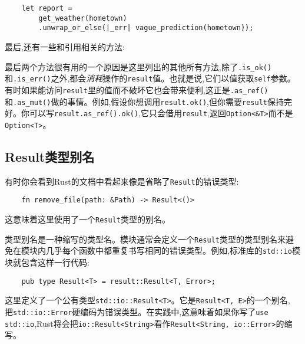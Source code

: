 \begin{verbatim}
    let report =
        get_weather(hometown)
        .unwrap_or_else(|_err| vague_prediction(hometown));
\end{verbatim}




最后,还有一些和引用相关的方法:


最后两个方法很有用的一个原因是这里列出的其他所有方法,除了\texttt{.is\_ok()}和\texttt{.is\_err()}之外,都会\emph{消耗}操作的\texttt{result}值。也就是说,它们以值获取\texttt{self}参数。有时如果能访问\texttt{result}里的值而不破坏它也会带来便利,这正是\texttt{.as\_ref()}和\texttt{.as\_mut()}做的事情。例如,假设你想调用\texttt{result.ok()},但你需要\texttt{result}保持完好。你可以写\texttt{result.as\_ref().ok()},它只会借用\texttt{result},返回\texttt{Option<\&T>}而不是\texttt{Option<T>}。

\subsection{Result类型别名}
有时你会看到Rust的文档中看起来像是省略了\texttt{Result}的错误类型:
\begin{verbatim}
    fn remove_file(path: &Path) -> Result<()>
\end{verbatim}
这意味着这里使用了一个\texttt{Result}类型的别名。

类型别名是一种缩写的类型名。模块通常会定义一个\texttt{Result}类型的类型别名来避免在模块内几乎每个函数中都重复书写相同的错误类型。例如,标准库的\texttt{std::io}模块就包含这样一行代码:
\begin{verbatim}
    pub type Result<T> = result::Result<T, Error>;
\end{verbatim}

这里定义了一个公有类型\texttt{std::io::Result<T>}。它是\texttt{Result<T, E>}的一个别名,\\
把\texttt{std::io::Error}硬编码为错误类型。在实践中,这意味着如果你写了\texttt{use std::io},Rust将会把\texttt{io::Result<String>}看作\texttt{Result<String, io::Error>}的缩写。

